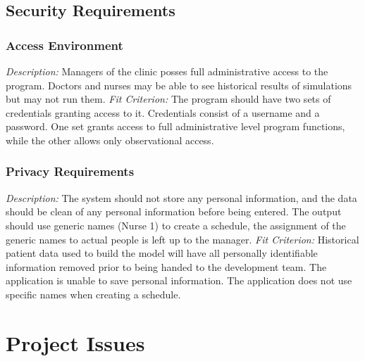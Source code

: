 \documentclass[12pt, titlepage]{article}
\begin{document}
\subsection{Security Requirements}
\subsubsection{Access Environment}
\textit{Description:}\newline
Managers of the clinic posses full administrative access to the program. Doctors and nurses may be able to see historical results of simulations but may not run them.
\newline \newline 
\textit{Fit Criterion:}\newline 
The program should have two sets of credentials granting access to it. Credentials consist of a username and a password. One set grants access to full administrative level program functions, while the other allows only observational access. 

\subsubsection{Privacy Requirements}
\textit{Description:}\newline
The system should not store any personal information, and the data should be clean of any personal information before being entered. The output should use generic names (Nurse 1) to create a schedule, the assignment of the generic names to actual people is left up to the manager.
\newline \newline 
\textit{Fit Criterion:}\newline 
Historical patient data used to build the model will have all personally identifiable information removed prior to being handed to the development team. The application is unable to save personal information. The application does not use specific names when creating a schedule.

\section{Project Issues}
\end{document}
